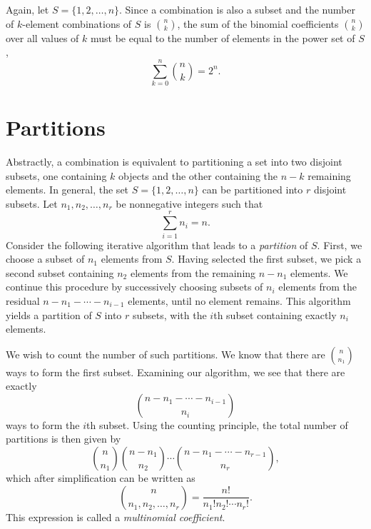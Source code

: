 Again, let $S = \{1, 2, \ldots, n\}$.
Since a combination is also a subset and the number of $k$-element combinations of $S$ is $\binom{n}{k}$, the sum of the binomial coefficients $\binom{n}{k}$ over all values of $k$ must be equal to the number of elements in the power set of $S$, 
\begin{equation*}
\sum_{k=0}^n \binom{n}{k} = 2^n .
\end{equation*}


\section{Partitions}

Abstractly, a combination is equivalent to partitioning a set into two disjoint subsets, one containing $k$ objects and the other containing the $n-k$ remaining elements.
In general, the set $S = \{ 1, 2, \ldots, n \}$ can be partitioned into $r$ disjoint subsets.
Let $n_1, n_2, \ldots, n_r$ be nonnegative integers such that
\begin{equation*}
\sum_{i = 1}^r n_i = n.
\end{equation*}
Consider the following iterative algorithm that leads to a \emph{partition} of $S$. 
First, we choose a subset of $n_1$ elements from $S$.
Having selected the first subset, we pick a second subset containing $n_2$ elements from the remaining $n - n_1$ elements.
We continue this procedure by successively choosing subsets of $n_i$ elements from the residual $n - n_1 - \cdots - n_{i-1}$ elements, until no element remains.
This algorithm yields a partition of $S$ into $r$ subsets, with the $i$th subset containing exactly $n_i$ elements.

We wish to count the number of such partitions.
We know that there are $\binom{n}{n_1}$ ways to form the first subset.
Examining our algorithm, we see that there are exactly
\begin{equation*}
\binom{n - n_1 - \cdots - n_{i-1}}{n_i}
\end{equation*}
ways to form the $i$th subset.
Using the counting principle, the total number of partitions is then given by
\begin{equation*}
\binom{n}{n_1} \binom{n - n_1}{n_2}
\cdots \binom{n - n_1 - \cdots - n_{r-1}}{n_r},
\end{equation*}
which after simplification can be written as
\begin{equation*}
\binom{n}{n_1, n_2, \ldots, n_r}
= \frac{n!}{n_1! n_2! \cdots n_r!} .
\end{equation*}
This expression is called a \emph{multinomial coefficient}. 

